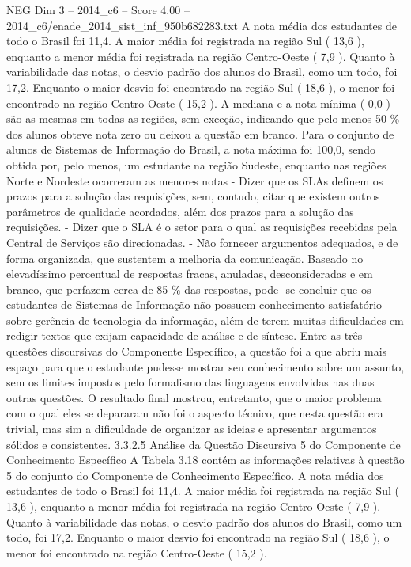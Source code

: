 \begin{textsample}{NEG Dim 3 – 2014\_c6 – Score 4.00 – 2014\_c6/enade\_2014\_sist\_inf\_950b682283.txt}
A nota média dos estudantes de todo o Brasil foi 11,4.
A maior média foi registrada na região Sul ( 13,6 ), enquanto a menor média foi registrada na região Centro-Oeste ( 7,9 ).
Quanto à variabilidade das notas, o desvio padrão dos alunos do Brasil, como um todo, foi 17,2.
Enquanto o maior desvio foi encontrado na região Sul ( 18,6 ), o menor foi encontrado na região Centro-Oeste ( 15,2 ).
A mediana e a nota mínima ( 0,0 ) são as mesmas em todas as regiões, sem exceção, indicando que pelo menos 50 \% dos alunos obteve nota zero ou deixou a questão em branco.
Para o conjunto de alunos de Sistemas de Informação do Brasil, a nota máxima foi 100,0, sendo obtida por, pelo menos, um estudante na região Sudeste, enquanto nas regiões Norte e Nordeste ocorreram as menores notas - Dizer que os SLAs definem os prazos para a solução das requisições, sem, contudo, citar que existem outros parâmetros de qualidade acordados, além dos prazos para a solução das requisições. - Dizer que o SLA é o setor para o qual as requisições recebidas pela Central de Serviços são direcionadas. - Não fornecer argumentos adequados, e de forma organizada, que sustentem a melhoria da comunicação.
Baseado no elevadíssimo percentual de respostas fracas, anuladas, desconsideradas e em branco, que perfazem cerca de 85 \% das respostas, pode -se concluir que os estudantes de Sistemas de Informação não possuem conhecimento satisfatório sobre gerência de tecnologia da informação, além de terem muitas dificuldades em redigir textos que exijam capacidade de análise e de síntese.
Entre as três questões discursivas do Componente Específico, a questão foi a que abriu mais espaço para que o estudante pudesse mostrar seu conhecimento sobre um assunto, sem os limites impostos pelo formalismo das linguagens envolvidas nas duas outras questões.
O resultado final mostrou, entretanto, que o maior problema com o qual eles se depararam não foi o aspecto técnico, que nesta questão era trivial, mas sim a dificuldade de organizar as ideias e apresentar argumentos sólidos e consistentes. 3.3.2.5 Análise da Questão Discursiva 5 do Componente de Conhecimento Específico A Tabela 3.18 contém as informações relativas à questão 5 do conjunto do Componente de Conhecimento Específico.
A nota média dos estudantes de todo o Brasil foi 11,4.
A maior média foi registrada na região Sul ( 13,6 ), enquanto a menor média foi registrada na região Centro-Oeste ( 7,9 ).
Quanto à variabilidade das notas, o desvio padrão dos alunos do Brasil, como um todo, foi 17,2.
Enquanto o maior desvio foi encontrado na região Sul ( 18,6 ), o menor foi encontrado na região Centro-Oeste ( 15,2 ).

\end{textsample}
